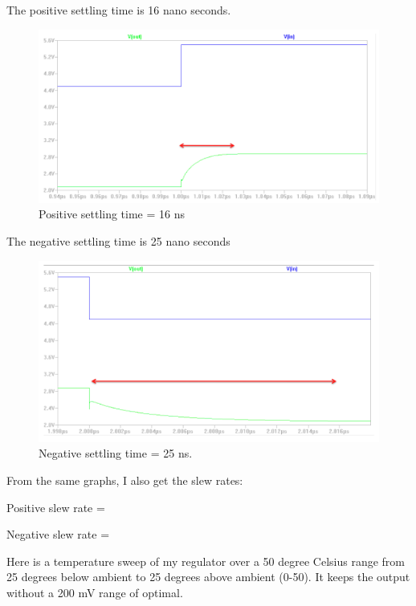 \documentclass[10pt]{amsart}
\begin{document}
\newpage

The positive settling time is 16 nano seconds.

\begin{figure}[h]
	\begin{center}
		\includegraphics[width=5in]{Media/pos.png}
	\end{center}
	\caption{Positive settling time = 16 ns}
	\label{fig:pos}
\end{figure}

The negative settling time is 25 nano seconds

\begin{figure}[h]
	\begin{center}
		\includegraphics[width=5in]{Media/neg.png}
	\end{center}
	\caption{Negative settling time = 25 ns.}
	\label{fig:neg}
\end{figure}

From the same graphs, I also get the slew rates:

Positive slew rate = 

Negative slew rate = 

Here is a temperature sweep of my regulator over a 50 degree Celsius range from 25 degrees below ambient to 25 degrees above ambient (0-50). It keeps the output without a 200 mV range of optimal.
\end{document}
